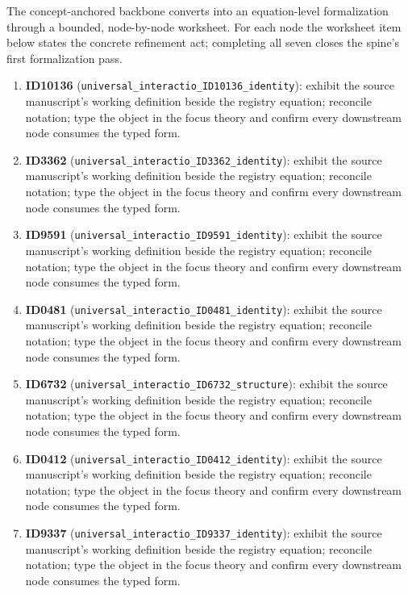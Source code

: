 \documentclass[11pt]{article}
\theoremstyle{remark}
\begin{document}
The concept-anchored backbone converts into an equation-level formalization through a bounded, node-by-node worksheet. For each node the worksheet item below states the concrete refinement act; completing all seven closes the spine's first formalization pass.

\begin{enumerate}
\item \textbf{ID10136} (\texttt{universal\_interactio\_ID10136\_identity}): exhibit the source manuscript's working definition beside the registry equation; reconcile notation; type the object in the focus theory and confirm every downstream node consumes the typed form.
\item \textbf{ID3362} (\texttt{universal\_interactio\_ID3362\_identity}): exhibit the source manuscript's working definition beside the registry equation; reconcile notation; type the object in the focus theory and confirm every downstream node consumes the typed form.
\item \textbf{ID9591} (\texttt{universal\_interactio\_ID9591\_identity}): exhibit the source manuscript's working definition beside the registry equation; reconcile notation; type the object in the focus theory and confirm every downstream node consumes the typed form.
\item \textbf{ID0481} (\texttt{universal\_interactio\_ID0481\_identity}): exhibit the source manuscript's working definition beside the registry equation; reconcile notation; type the object in the focus theory and confirm every downstream node consumes the typed form.
\item \textbf{ID6732} (\texttt{universal\_interactio\_ID6732\_structure}): exhibit the source manuscript's working definition beside the registry equation; reconcile notation; type the object in the focus theory and confirm every downstream node consumes the typed form.
\item \textbf{ID0412} (\texttt{universal\_interactio\_ID0412\_identity}): exhibit the source manuscript's working definition beside the registry equation; reconcile notation; type the object in the focus theory and confirm every downstream node consumes the typed form.
\item \textbf{ID9337} (\texttt{universal\_interactio\_ID9337\_identity}): exhibit the source manuscript's working definition beside the registry equation; reconcile notation; type the object in the focus theory and confirm every downstream node consumes the typed form.
\end{enumerate}
\end{document}
